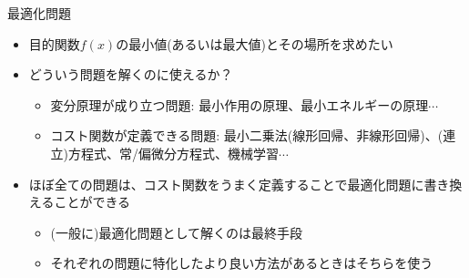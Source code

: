 \begin{frame}[t,fragile]{最適化問題}
  \begin{itemize}
  \item 目的関数$f(x)$の最小値(あるいは最大値)とその場所を求めたい
  \item どういう問題を解くのに使えるか？
    \begin{itemize}
    \item 変分原理が成り立つ問題: 最小作用の原理、最小エネルギーの原理$\cdots$
    \item コスト関数が定義できる問題: 最小二乗法(線形回帰、非線形回帰)、(連立)方程式、常/偏微分方程式、機械学習$\cdots$
    \end{itemize}
  \item ほぼ全ての問題は、コスト関数をうまく定義することで最適化問題に書き換えることができる
    \begin{itemize}
    \item (一般に)最適化問題として解くのは最終手段
    \item それぞれの問題に特化したより良い方法があるときはそちらを使う
    \end{itemize}
  \end{itemize}
\end{frame}
